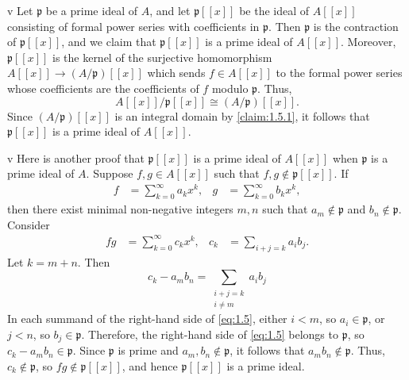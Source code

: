 \begin{partsolution}{v}
Let \(\mathfrak{p}\) be a prime ideal of \(A\), and let \(\mathfrak{p}[[x]]\) be the ideal of \(A[[x]]\) consisting of formal power series with coefficients in \(\mathfrak{p}\).
Then \(\mathfrak{p}\) is the contraction of \(\mathfrak{p}[[x]]\), and we claim that \(\mathfrak{p}[[x]]\) is a prime ideal of \(A[[x]]\).
Moreover, \(\mathfrak{p}[[x]]\) is the kernel of the surjective homomorphism \(A[[x]] \to (A / \mathfrak{p})[[x]]\) which sends \(f \in A[[x]]\) to the formal power series whose coefficients are the coefficients of \(f\) modulo \(\mathfrak{p}\).
Thus,
\begin{equation*}
A[[x]] / \mathfrak{p}[[x]] \cong (A / \mathfrak{p})[[x]].
\end{equation*}
Since \((A / \mathfrak{p})[[x]]\) is an integral domain by \autoref{claim:1.5.1}, it follows that \(\mathfrak{p}[[x]]\) is a prime ideal of \(A[[x]]\).
\end{partsolution}

\begin{altpartsolution}{v}
Here is another proof that \(\mathfrak p[[x]]\) is a prime ideal of \(A[[x]]\) when \(\mathfrak{p}\) is a prime ideal of \(A\).
Suppose \(f, g \in A[[x]]\) such that \(f, g \notin \mathfrak p[[x]]\).
If
\begin{align*}
f &= \sum_{k=0}^\infty a_k x^k, &
g &= \sum_{k=0}^\infty b_k x^k,
\end{align*}
then there exist minimal non-negative integers \(m, n\) such that \(a_m \notin \mathfrak p\) and \(b_n \notin \mathfrak p\).
Consider
\begin{align*}
f g &= \sum_{k=0}^\infty c_k x^k, &
c_k &= \sum_{i + j = k} a_i b_j.
\end{align*}
Let \(k = m + n\).
Then
\begin{equation}
\label{eq:1.5}
c_k - a_m b_n
= \sum_{\substack{i + j = k \\ i \neq m}} a_i b_j
\end{equation}
In each summand of the right-hand side of \eqref{eq:1.5}, either \(i < m\), so \(a_i \in \mathfrak p\), or \(j < n\), so \(b_j \in \mathfrak p\).
Therefore, the right-hand side of \eqref{eq:1.5} belongs to \(\mathfrak{p}\), so \(c_k - a_m b_n \in \mathfrak{p}\).
Since \(\mathfrak{p}\) is prime and \(a_m, b_n \notin \mathfrak{p}\), it follows that \(a_m b_n \notin\mathfrak{p}\).
Thus, \(c_k \notin \mathfrak p\), so \(f g \notin \mathfrak{p}[[x]]\), and hence \(\mathfrak{p}[[x]]\) is a prime ideal.
\end{altpartsolution}